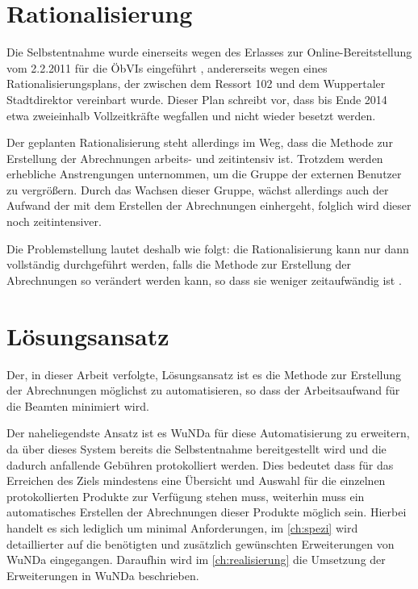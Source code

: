 \section{Rationalisierung} \label{sec:rationalisierung}
Die Selbstentnahme wurde einerseits wegen des Erlasses zur Online-Bereitstellung vom 2.2.2011 für die \acp{ÖbVI} eingeführt \autocite[vgl.][]{wupp-wunda-oebvi}, andererseits wegen eines Rationalisierungsplans, der zwischen dem Ressort 102 und dem Wuppertaler Stadtdirektor vereinbart wurde.
Dieser Plan schreibt vor, dass bis Ende 2014 etwa zweieinhalb  Vollzeitkräfte wegfallen und nicht wieder besetzt werden.

Der geplanten Rationalisierung steht allerdings im Weg, dass die Methode zur Erstellung der Abrechnungen arbeits- und zeitintensiv ist.
Trotzdem werden erhebliche Anstrengungen unternommen, um die Gruppe der externen Benutzer zu vergrößern.
Durch das Wachsen dieser Gruppe, wächst allerdings auch der Aufwand der mit dem Erstellen der Abrechnungen einhergeht, folglich wird dieser noch zeitintensiver.

Die Problemstellung lautet deshalb wie folgt: die Rationalisierung kann nur dann vollständig durchgeführt werden, falls die Methode zur Erstellung der Abrechnungen so verändert werden kann, so dass sie weniger zeitaufwändig ist \autocite[vgl.][]{sander-abrechnung}. 


\section{Lösungsansatz}

Der, in dieser Arbeit verfolgte, Lösungsansatz ist es die Methode zur Erstellung der Abrechnungen möglichst zu automatisieren, so dass der Arbeitsaufwand für die Beamten minimiert wird. 

Der naheliegendste Ansatz ist es \acs{WuNDa} für diese Automatisierung zu erweitern, da über dieses System bereits die Selbstentnahme bereitgestellt wird und die dadurch anfallende Gebühren protokolliert werden. Dies bedeutet dass für das Erreichen des Ziels mindestens eine Übersicht und Auswahl für die einzelnen protokollierten Produkte zur Verfügung stehen muss, weiterhin muss ein automatisches Erstellen der Abrechnungen dieser Produkte möglich sein. Hierbei handelt es sich lediglich um minimal Anforderungen, im \autoref{ch:spezi} wird detaillierter auf die benötigten und zusätzlich gewünschten Erweiterungen von \ac{WuNDa} eingegangen. Daraufhin wird im \autoref{ch:realisierung} die Umsetzung der Erweiterungen in \ac{WuNDa} beschrieben.

